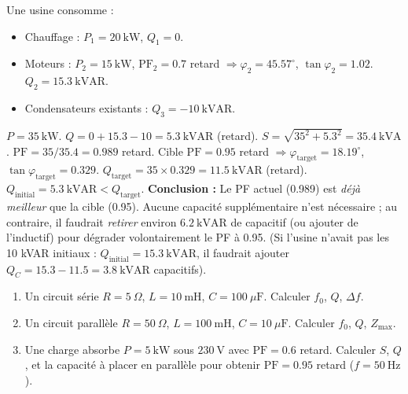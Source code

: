 \documentclass[11pt]{article}
\begin{document}
\begin{exoresolu}
Une usine consomme :
\begin{itemize}
\item Chauffage : $P_1 = 20\ \mathrm{kW}$, $Q_1 = 0$.
\item Moteurs : $P_2 = 15\ \mathrm{kW}$, $\mathrm{PF}_2 = 0.7$ retard $\Rightarrow \varphi_2 = 45.57^\circ$, $\tan\varphi_2 = 1.02$. $Q_2 = 15.3\ \mathrm{kVAR}$.
\item Condensateurs existants : $Q_3 = -10\ \mathrm{kVAR}$.
\end{itemize}
$P = 35\ \mathrm{kW}$. $Q = 0 + 15.3 - 10 = 5.3\ \mathrm{kVAR}$ (retard).
$S = \sqrt{35^2 + 5.3^2} = 35.4\ \mathrm{kVA}$.
$\mathrm{PF} = 35/35.4 = 0.989$ retard.
Cible $\mathrm{PF} = 0.95$ retard $\Rightarrow \varphi_{\mathrm{target}} = 18.19^\circ$, $\tan\varphi_{\mathrm{target}} = 0.329$.
$Q_{\mathrm{target}} = 35 \times 0.329 = 11.5\ \mathrm{kVAR}$ (retard).
$Q_{\mathrm{initial}} = 5.3\ \mathrm{kVAR} < Q_{\mathrm{target}}$.
\textbf{Conclusion :} Le PF actuel (0.989) est \emph{déjà meilleur} que la cible (0.95). Aucune capacité supplémentaire n'est nécessaire ; au contraire, il faudrait \emph{retirer} environ $6.2\ \mathrm{kVAR}$ de capacitif (ou ajouter de l'inductif) pour dégrader volontairement le PF à 0.95.
(Si l'usine n'avait pas les 10 kVAR initiaux : $Q_{\mathrm{initial}} = 15.3\ \mathrm{kVAR}$, il faudrait ajouter $Q_C = 15.3 - 11.5 = 3.8\ \mathrm{kVAR}$ capacitifs).
\end{exoresolu}

\begin{exercice}
\begin{enumerate}
\item Un circuit série $R=5\ \Omega$, $L=10\ \mathrm{mH}$, $C=100\ \mu\mathrm{F}$. Calculer $f_0$, $Q$, $\Delta f$.
\item Un circuit parallèle $R=50\ \Omega$, $L=100\ \mathrm{mH}$, $C=10\ \mu\mathrm{F}$. Calculer $f_0$, $Q$, $Z_{\max}$.
\item Une charge absorbe $P=5\ \mathrm{kW}$ sous $230\ \mathrm{V}$ avec $\mathrm{PF}=0.6$ retard. Calculer $S$, $Q$, et la capacité à placer en parallèle pour obtenir $\mathrm{PF}=0.95$ retard ($f=50\ \mathrm{Hz}$).
\end{enumerate}
\end{exercice}
\end{document}
